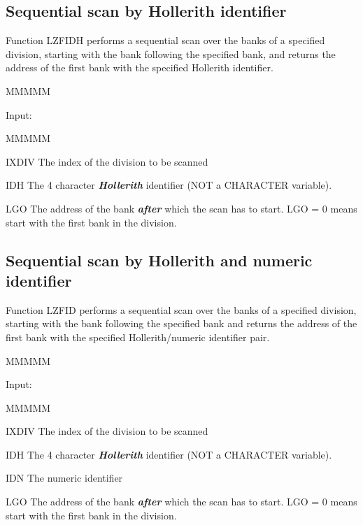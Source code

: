 \subsection{Sequential scan by Hollerith identifier}
\par
Function LZFIDH performs a sequential scan over the banks of a specified
division, starting with the bank following the specified bank,
and returns
the address of the first bank with the specified Hollerith identifier.
\begin{DL}{MMMMM}
\item[Input:
]
\begin{DL}{MMMMM}
\item[IXDIV
]The index of the division to be scanned
\item[IDH
]The 4 character {\bf\it Hollerith} identifier (NOT a CHARACTER
variable).
\item[LGO
]The address of the bank {\bf\it after} which the scan has to start.
\newline LGO = 0 means start with the first bank in the division.
\end{DL}
\end{DL}
\subsection{Sequential scan by Hollerith and numeric identifier}
\par
Function LZFID performs a sequential scan over the banks of a specified
division, starting with the bank following the specified bank and returns
the address of the first bank with the specified Hollerith/numeric
identifier pair.
\begin{DL}{MMMMM}
\item[Input:
]
\begin{DL}{MMMMM}
\item[IXDIV
]The index of the division to be scanned
\item[IDH
]The 4 character {\bf\it Hollerith} identifier (NOT a CHARACTER
variable).
\item[IDN
]The numeric identifier
\item[LGO
]The address of the bank {\bf\it after} which the scan has to start.
\newline LGO = 0 means start with the first bank in the division.
\end{DL}
\end{DL}
